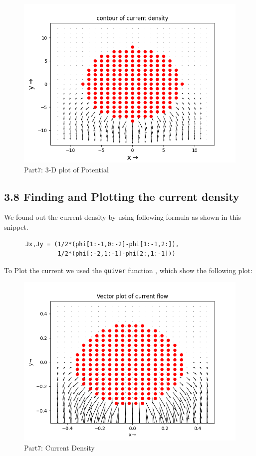 \documentclass[12pt, a4paper]{report}
\begin{document}
  \begin{figure}[H]
	\centering
	\includegraphics[scale=0.8]{Figure_9.png} 
	\caption{Part7: 3-D plot of Potential}
	\label{fig:10}
  \end{figure}
 
 \subsection*{3.8 Finding and Plotting the current density}
  We found out the current density by using following formula as shown in this snippet.
  \begin{verbatim}
      Jx,Jy = (1/2*(phi[1:-1,0:-2]-phi[1:-1,2:]),
               1/2*(phi[:-2,1:-1]-phi[2:,1:-1]))
  \end{verbatim}
  To Plot the current we used the \texttt{quiver} function , which show the following plot:
  \begin{figure}[H]
	\centering
	\includegraphics[scale=0.8]{Figure_11.png} 
	\caption{Part7: Current Density}
	\label{fig:0}
  \end{figure}
  
\end{document}

